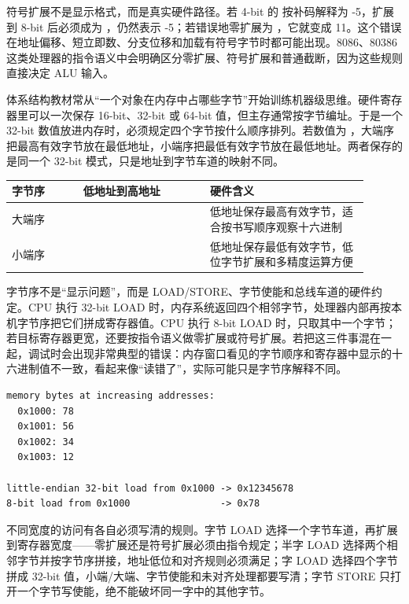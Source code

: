 符号扩展不是显示格式，而是真实硬件路径。若 4-bit 的  按补码解释为 -5，扩展到 8-bit 后必须成为 ，仍然表示 -5；若错误地零扩展为 ，它就变成 11。这个错误在地址偏移、短立即数、分支位移和加载有符号字节时都可能出现。8086、80386 这类处理器的指令语义中会明确区分零扩展、符号扩展和普通截断，因为这些规则直接决定 ALU 输入。

体系结构教材常从“一个对象在内存中占哪些字节”开始训练机器级思维。硬件寄存器里可以一次保存 16-bit、32-bit 或 64-bit 值，但主存通常按字节编址。于是一个 32-bit 数值放进内存时，必须规定四个字节按什么顺序排列。若数值为 ，大端序把最高有效字节放在最低地址，小端序把最低有效字节放在最低地址。两者保存的是同一个 32-bit 模式，只是地址到字节车道的映射不同。

\begin{longtable}{L{0.18\linewidth}L{0.32\linewidth}L{0.4\linewidth}}
\toprule
字节序 & 低地址到高地址 & 硬件含义 \\
\midrule
大端序 &  & 低地址保存最高有效字节，适合按书写顺序观察十六进制 \\\tablerowrule
小端序 &  & 低地址保存最低有效字节，低位字节扩展和多精度运算方便 \\
\bottomrule
\end{longtable}

字节序不是“显示问题”，而是 LOAD/STORE、字节使能和总线车道的硬件约定。CPU 执行 32-bit LOAD 时，内存系统返回四个相邻字节，处理器内部再按本机字节序把它们拼成寄存器值。CPU 执行 8-bit LOAD 时，只取其中一个字节；若目标寄存器更宽，还要按指令语义做零扩展或符号扩展。若把这三件事混在一起，调试时会出现非常典型的错误：内存窗口看见的字节顺序和寄存器中显示的十六进制值不一致，看起来像“读错了”，实际可能只是字节序解释不同。

\begin{lstlisting}
memory bytes at increasing addresses:
  0x1000: 78
  0x1001: 56
  0x1002: 34
  0x1003: 12

little-endian 32-bit load from 0x1000 -> 0x12345678
8-bit load from 0x1000                -> 0x78
\end{lstlisting}

不同宽度的访问有各自必须写清的规则。字节 LOAD 选择一个字节车道，再扩展到寄存器宽度——零扩展还是符号扩展必须由指令规定；半字 LOAD 选择两个相邻字节并按字节序拼接，地址低位和对齐规则必须满足；字 LOAD 选择四个字节拼成 32-bit 值，小端/大端、字节使能和未对齐处理都要写清；字节 STORE 只打开一个字节写使能，绝不能破坏同一字中的其他字节。

